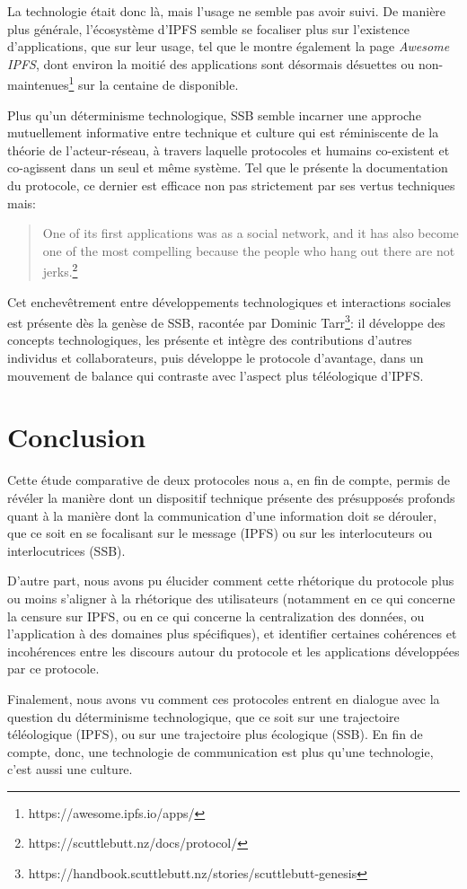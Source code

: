 \documentclass{article}
\begin{document}
La technologie était donc là, mais l'usage ne semble pas avoir suivi. De manière plus générale, l'écosystème d'IPFS semble se focaliser plus sur l'existence d'applications, que sur leur usage, tel que le montre également la page \emph{Awesome IPFS}, dont environ la moitié des applications sont désormais désuettes ou non-maintenues\footnote{https://awesome.ipfs.io/apps/} sur la centaine de disponible.

Plus qu'un déterminisme technologique, SSB semble incarner une approche mutuellement informative entre technique et culture qui est réminiscente de la théorie de l'acteur-réseau, à travers laquelle protocoles et humains co-existent et co-agissent dans un seul et même système\cite{latour_reassembling_2005}. Tel que le présente la documentation du protocole, ce dernier est efficace non pas strictement par ses vertus techniques mais:

\begin{quote}
    One of its first applications was as a social network, and it has also become one of the most compelling because the people who hang out there are not jerks.\footnote{https://scuttlebutt.nz/docs/protocol/}
\end{quote}

Cet enchevêtrement entre développements technologiques et interactions sociales est présente dès la genèse de SSB, racontée par Dominic Tarr\footnote{https://handbook.scuttlebutt.nz/stories/scuttlebutt-genesis}: il développe des concepts technologiques, les présente et intègre des contributions d'autres individus et collaborateurs, puis développe le protocole d'avantage, dans un mouvement de balance qui contraste avec l'aspect plus téléologique d'IPFS.

\section{Conclusion}

Cette étude comparative de deux protocoles nous a, en fin de compte, permis de révéler la manière dont un dispositif technique présente des présupposés profonds quant à la manière dont la communication d'une information doit se dérouler, que ce soit en se focalisant sur le message (IPFS) ou sur les interlocuteurs ou interlocutrices (SSB).

D'autre part, nous avons pu élucider comment cette rhétorique du protocole plus ou moins s'aligner à la rhétorique des utilisateurs (notamment en ce qui concerne la censure sur IPFS, ou en ce qui concerne la centralization des données, ou l'application à des domaines plus spécifiques), et identifier certaines cohérences et incohérences entre les discours autour du protocole et les applications développées par ce protocole.

Finalement, nous avons vu comment ces protocoles entrent en dialogue avec la question du déterminisme technologique, que ce soit sur une trajectoire téléologique (IPFS), ou sur une trajectoire plus écologique (SSB). En fin de compte, donc, une technologie de communication est plus qu'une technologie, c'est aussi une culture.

\pagebreak



\end{document}
